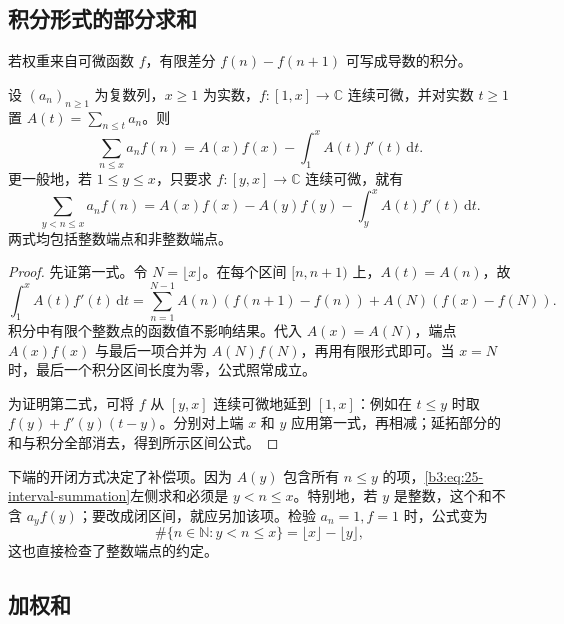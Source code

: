 \subsection{积分形式的部分求和}
\label{b3:subsec:250302}

若权重来自可微函数 \(f\)，有限差分 \(f(n)-f(n+1)\) 可写成导数的积分。

\begin{proposition}\label{b3:prop:25-integral-summation}
设 \((a_n)_{n\ge1}\) 为复数列，\(x\ge1\) 为实数，\(f:[1,x]\to\mathbb C\) 连续可微，并对实数 \(t\ge1\) 置 \(A(t)=\sum_{n\le t}a_n\)。则
\begin{equation}\label{b3:eq:25-partial-summation}
 \sum_{n\le x}a_nf(n)
 =A(x)f(x)-\int_1^x A(t)f'(t)\,\mathrm dt.
\end{equation}
更一般地，若 \(1\le y\le x\)，只要求 \(f:[y,x]\to\mathbb C\) 连续可微，就有
\begin{equation}\label{b3:eq:25-interval-summation}
 \sum_{y<n\le x}a_nf(n)
 =A(x)f(x)-A(y)f(y)-\int_y^x A(t)f'(t)\,\mathrm dt.
\end{equation}
两式均包括整数端点和非整数端点。
\end{proposition}
\begin{proof}
先证第一式。令 \(N=\lfloor x\rfloor\)。在每个区间 \([n,n+1)\) 上，\(A(t)=A(n)\)，故
\[
 \int_1^x A(t)f'(t)\,\mathrm dt
 =\sum_{n=1}^{N-1}A(n)(f(n+1)-f(n))
    +A(N)(f(x)-f(N)).
\]
积分中有限个整数点的函数值不影响结果。代入 \(A(x)=A(N)\)，端点 \(A(x)f(x)\) 与最后一项合并为 \(A(N)f(N)\)，再用有限形式即可。当 \(x=N\) 时，最后一个积分区间长度为零，公式照常成立。

为证明第二式，可将 \(f\) 从 \([y,x]\) 连续可微地延到 \([1,x]\)：例如在 \(t\le y\) 时取 \(f(y)+f'(y)(t-y)\)。分别对上端 \(x\) 和 \(y\) 应用第一式，再相减；延拓部分的和与积分全部消去，得到所示区间公式。
\end{proof}

下端的开闭方式决定了补偿项。因为 \(A(y)\) 包含所有 \(n\le y\) 的项，\eqref{b3:eq:25-interval-summation}左侧求和必须是 \(y<n\le x\)。特别地，若 \(y\) 是整数，这个和不含 \(a_yf(y)\)；要改成闭区间，就应另加该项。检验 \(a_n=1,f=1\) 时，公式变为
\[
 \#\{n\in\mathbb N:y<n\le x\}=\lfloor x\rfloor-\lfloor y\rfloor,
\]
这也直接检查了整数端点的约定。

\subsection{加权和}
\label{b3:subsec:250303}

